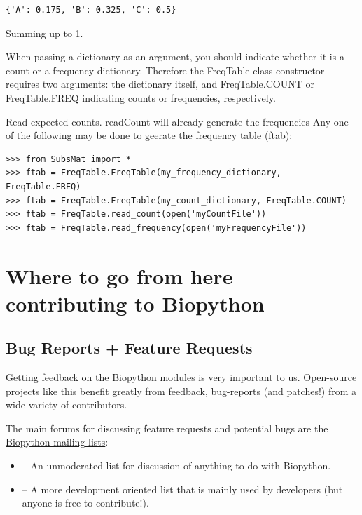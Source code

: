 \documentclass{report}
\begin{document}
\begin{enumerate}
\begin{verbatim}
{'A': 0.175, 'B': 0.325, 'C': 0.5}
\end{verbatim}

Summing up to 1.

When passing a dictionary as an argument, you should indicate whether it is a count or a frequency dictionary. Therefore the FreqTable class constructor requires two arguments: the dictionary itself, and FreqTable.COUNT or FreqTable.FREQ indicating counts or frequencies, respectively.

Read expected counts. readCount will already generate the frequencies
Any one of the following may be done to geerate the frequency table (ftab):

\begin{verbatim}
>>> from SubsMat import *
>>> ftab = FreqTable.FreqTable(my_frequency_dictionary, FreqTable.FREQ)
>>> ftab = FreqTable.FreqTable(my_count_dictionary, FreqTable.COUNT)
>>> ftab = FreqTable.read_count(open('myCountFile'))
>>> ftab = FreqTable.read_frequency(open('myFrequencyFile'))
\end{verbatim}

\end{enumerate}

\chapter{Where to go from here -- contributing to Biopython}

\section{Bug Reports + Feature Requests}

Getting feedback on the Biopython modules is very important to us. Open-source projects like this benefit greatly from feedback, bug-reports (and patches!) from a wide variety of contributors.

The main forums for discussing feature requests and potential bugs are the
\href{http://biopython.org/wiki/Mailing_lists}{Biopython mailing lists}:

\begin{itemize}
  \item {} -- An unmoderated list for discussion of anything to do with Biopython.

  \item {} -- A more development oriented list that is mainly used by developers (but anyone is free to contribute!).
\end{itemize}
\end{document}
